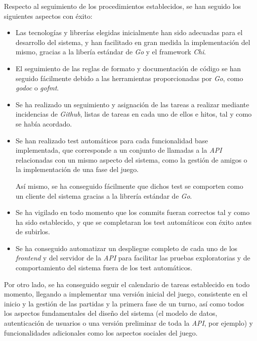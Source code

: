 \documentclass[11pt, a4paper, titlepage]{article}
\begin{document}
Respecto al seguimiento de los procedimientos establecidos, se han seguido los siguientes aspectos con éxito:

\begin{itemize}
    \item Las tecnologías y librerías elegidas inicialmente han sido adecuadas para el desarrollo del sistema, y han facilitado en gran medida la implementación del mismo, gracias a la libería estándar de \textit{Go} y el framework \textit{Chi}.

    \item El seguimiento de las reglas de formato y documentación de código se han seguido fácilmente debido a las herramientas proporcionadas por \textit{Go}, como \textit{godoc} o \textit{gofmt}.

    \item Se ha realizado un seguimiento y asignación de las tareas a realizar mediante incidencias de \textit{Github},  listas de tareas en cada uno de ellos e hitos, tal y como se había acordado.

    \item Se han realizado test automáticos para cada funcionalidad base implementada, que corresponde a un conjunto de llamadas a la \textit{API} relacionadas con un mismo aspecto del sistema, como la gestión de amigos o la implementación de una fase del juego.

    Así mismo, se ha conseguido fácilmente que dichos test se comporten como un cliente del sistema gracias a la librería estándar de \textit{Go}.

    \item Se ha vigilado en todo momento que los commits fueran correctos tal y como ha sido establecido, y que se completaran los test automáticos con éxito antes de subirlos.

    \item Se ha conseguido automatizar un despliegue completo de cada uno de los \textit{frontend} y del servidor de la \textit{API} para facilitar las pruebas exploratorias y de comportamiento del sistema fuera de los test automáticos.
\end{itemize}


Por otro lado, se ha conseguido seguir el calendario de tareas establecido en todo momento, llegando a implementar una versión inicial del juego, consistente en el inicio y la gestión de las partidas y la primera fase de un turno, así como todos los aspectos fundamentales del diseño del sistema (el modelo de datos, autenticación de usuarios o una versión preliminar de toda la \textit{API}, por ejemplo) y funcionalidades adicionales como los aspectos sociales del juego.\\
\end{document}
